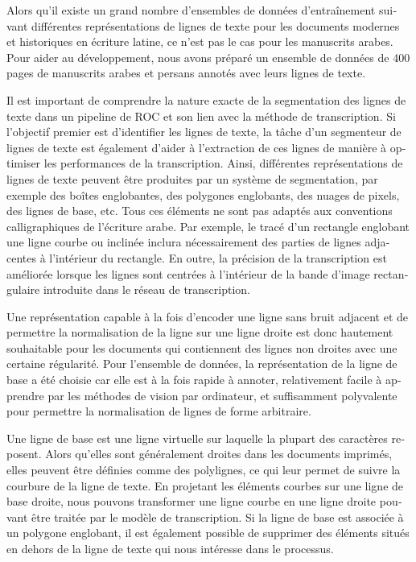 \begin{french}
Alors qu'il existe un grand nombre d'ensembles de données d'entraînement
suivant différentes représentations de lignes de texte pour les documents
modernes et historiques en écriture latine, ce n'est pas le cas pour les
manuscrits arabes. Pour aider au développement, nous avons préparé un ensemble
de données de 400 pages de manuscrits arabes et persans annotés avec leurs
lignes de texte.

Il est important de comprendre la nature exacte de la segmentation des lignes
de texte dans un pipeline de ROC et son lien avec la méthode de transcription. Si
l'objectif premier est d'identifier les lignes de texte, la tâche d'un
segmenteur de lignes de texte est également d'aider à l'extraction de ces lignes
de manière à optimiser les performances de la transcription. Ainsi, différentes
représentations de lignes de texte peuvent être produites par un système de
segmentation, par exemple des boîtes englobantes, des polygones englobants, des
nuages de pixels, des lignes de base, etc. Tous ces éléments ne sont pas
adaptés aux conventions calligraphiques de l'écriture arabe. Par exemple, le
tracé d'un rectangle englobant une ligne courbe ou inclinée inclura
nécessairement des parties de lignes adjacentes à l'intérieur du rectangle.  En
outre, la précision de la transcription est améliorée lorsque les lignes sont
centrées à l'intérieur de la bande d'image rectangulaire introduite dans le
réseau de transcription.

Une représentation capable à la fois d'encoder une ligne sans bruit adjacent et
de permettre la normalisation de la ligne sur une ligne droite est donc
hautement souhaitable pour les documents qui contiennent des lignes non droites
avec une certaine régularité.  Pour l'ensemble de données, la représentation de
la ligne de base a été choisie car elle est à la fois rapide à annoter,
relativement facile à apprendre par les méthodes de vision par ordinateur, et
suffisamment polyvalente pour permettre la normalisation de lignes de forme
arbitraire.

Une ligne de base est une ligne virtuelle sur laquelle la plupart des
caractères reposent. Alors qu'elles sont généralement droites dans les documents
imprimés, elles peuvent être définies comme des polylignes, ce qui leur permet de
suivre la courbure de la ligne de texte. En projetant les éléments courbes sur une ligne
de base droite, nous pouvons transformer une ligne courbe en une ligne droite
pouvant être traitée par le modèle de transcription. Si la ligne de base est
associée à un polygone englobant, il est également possible de supprimer des
éléments situés en dehors de la ligne de texte qui nous intéresse dans le processus.


\end{french}
